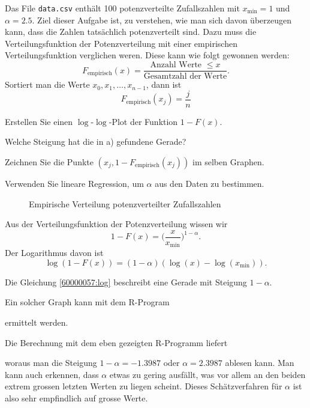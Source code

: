 Das File \texttt{data.csv} enthält 100 potenzverteilte Zufallszahlen mit
$x_{\text{min}}=1$ und $\alpha=2.5$.
Ziel dieser Aufgabe ist, zu verstehen, wie man sich davon überzeugen
kann, dass die Zahlen tatsächlich potenzverteilt sind.
Dazu muss die Verteilungsfunktion der Potenzverteilung mit einer
empirischen Verteilungsfunktion verglichen weren.
Diese kann wie folgt gewonnen werden:
\[
F_{\text{empirisch}}(x)
=
\frac{\text{Anzahl Werte $\le x$}}{\text{Gesamtzahl der Werte}}.
\]
Sortiert man die Werte $x_0,x_1,\dots,x_{n-1}$, dann ist 
\begin{equation}
F_{\text{empirisch}}(x_j) = \frac{j}{n}
\label{60000057}
\end{equation}
\begin{teilaufgaben}
\item 
Erstellen Sie einen $\log$-$\log$-Plot der Funktion $1-F(x)$.
\item
Welche Steigung hat die in a) gefundene Gerade?
\item
Zeichnen Sie die Punkte $(x_j,1-F_{\text{empirisch}}(x_j))$
im selben Graphen.
\item
Verwenden Sie lineare Regression, um $\alpha$ aus den Daten
zu bestimmen.
\end{teilaufgaben}


\begin{loesung}
\begin{figure}
\centering
{}
\caption{Empirische Verteilung potenzverteilter Zufallszahlen
\label{60000057:graph}
}
\end{figure}
\begin{teilaufgaben}
\item
Aus der Verteilungsfunktion der Potenzverteilung wissen wir
\[
1-F(x)
=
\biggl(\frac{x}{x_{\text{min}}} \biggr)^{1-\alpha}.
\]
Der Logarithmus davon ist
\begin{equation}
\log(1-F(x))=(1-\alpha)(\log(x) - \log(x_{\text{min}})).
\label{60000057:log}
\end{equation}
\item
Die Gleichung \eqref{60000057:log} beschreibt eine Gerade mit
Steigung $1-\alpha$.
\item
Ein solcher Graph kann mit dem R-Program
\begin{small}
\end{small}
ermittelt werden.
\item
Die Berechnung mit dem eben gezeigten R-Programm liefert
\begin{small}
\end{small}
woraus man die Steigung $1-\alpha=-1.3987$ oder $\alpha=2.3987$
ablesen kann.
Man kann auch erkennen, dass $\alpha$ etwas zu gering ausfällt,
was vor allem an den beiden extrem grossen letzten Werten zu liegen
scheint.
Dieses Schätzverfahren für $\alpha$ ist also sehr empfindlich auf
grosse Werte.
\qedhere
\end{teilaufgaben}
\end{loesung}



